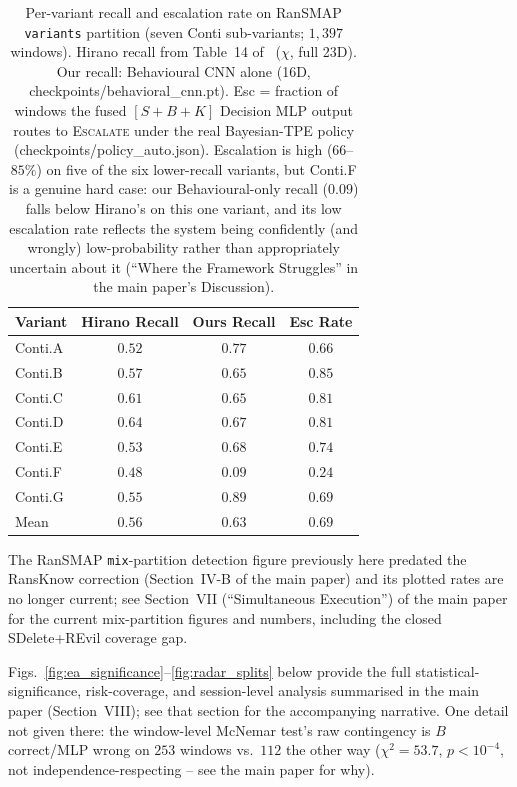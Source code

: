 \documentclass[journal]{IEEEtran}
\begin{document}
\begin{table}[h]
\centering
\footnotesize
\caption{Per-variant recall and escalation rate on RanSMAP
  \texttt{variants} partition (seven Conti sub-variants; $1{,}397$ windows).
  Hirano recall from Table~14 of~\cite{hirano2025ransmap} ($\chi$, full 23D).
  Our recall: Behavioural CNN alone (16D, checkpoints/behavioral\_cnn.pt).
  Esc = fraction of windows the fused $[S{+}B{+}K]$ Decision MLP output
  routes to \textsc{Escalate} under the real Bayesian-TPE policy
  (checkpoints/policy\_auto.json). Escalation is high ($66$--$85\%$) on
  five of the six lower-recall variants, but Conti.F is a genuine hard
  case: our Behavioural-only recall ($0.09$) falls below Hirano's on
  this one variant, and its low escalation rate reflects the system
  being confidently (and wrongly) low-probability rather than
  appropriately uncertain about it (``Where the Framework Struggles''
  in the main paper's Discussion).}
\label{tab:ood_variants}
\setlength{\tabcolsep}{4pt}
\begin{tabular}{lccc}
\toprule
Variant & Hirano Recall & Ours Recall & Esc Rate \\
\midrule
Conti.A & $0.52$ & $0.77$ & $0.66$ \\
Conti.B & $0.57$ & $0.65$ & $0.85$ \\
Conti.C & $0.61$ & $0.65$ & $0.81$ \\
Conti.D & $0.64$ & $0.67$ & $0.81$ \\
Conti.E & $0.53$ & $0.68$ & $0.74$ \\
Conti.F & $0.48$ & $0.09$ & $0.24$ \\
Conti.G & $0.55$ & $0.89$ & $0.69$ \\
\midrule
Mean    & $0.56$ & $\mathbf{0.63}$ & $0.69$ \\
\bottomrule
\end{tabular}
\end{table}

The RanSMAP \texttt{mix}-partition detection figure previously here
predated the RansKnow correction (Section~IV-B of the main paper) and
its plotted rates are no longer current; see Section~VII
(``Simultaneous Execution'') of the main paper for the current
mix-partition figures and numbers, including the closed SDelete+REvil
coverage gap.

Figs.~\ref{fig:ea_significance}--\ref{fig:radar_splits} below provide the
full statistical-significance, risk-coverage, and session-level analysis
summarised in the main paper (Section~VIII); see that section for the
accompanying narrative. One detail not given there: the window-level
McNemar test's raw contingency is $B$ correct/MLP wrong on $253$ windows
vs.\ $112$ the other way ($\chi^2{=}53.7$, $p{<}10^{-4}$, not
independence-respecting -- see the main paper for why).
\end{document}
